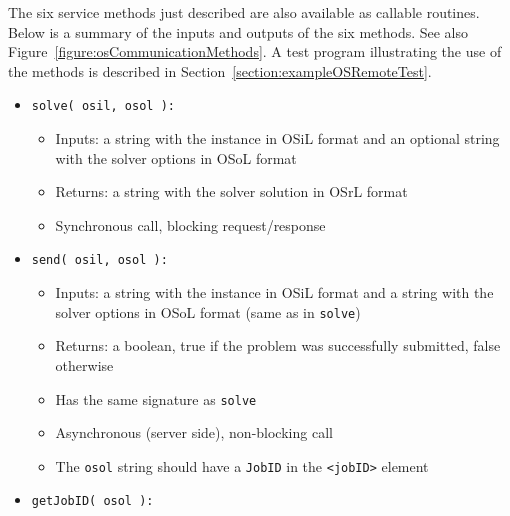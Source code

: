 \documentclass[11pt]{article}
\newcounter{Fig}
\renewcommand{\_}{{\char"5F}}
\renewcommand{\{}{{\char"7B}}
\renewcommand{\}}{{\char"7D}}
\renewcommand{\^}{{\char"0D}}
\renewcommand{\'}{{\char"0D}}
\begin{document}
\begin{enumerate}[Step 1:]
The six service methods just described are also available as callable routines.
Below is a summary of the inputs and outputs of the six methods. See also Figure~\ref{figure:osCommunicationMethods}.
A test program illustrating the use of the methods is described in Section~\ref{section:exampleOSRemoteTest}.

\begin{itemize}

\item {\tt solve( osil, osol ):}

\begin{itemize}

\item Inputs: a string with the instance in OSiL format and an optional string with the solver options
in OSoL format

\item Returns: a string with the solver solution in OSrL format

\item Synchronous call, blocking request/response

\end{itemize}



\item {\tt send( osil, osol ):}

\begin{itemize}

\item Inputs: a string with the instance in OSiL format and a string with the solver options
in OSoL format (same as in {\tt solve})

\item Returns:  a boolean, true if the problem was successfully submitted, false otherwise

\item Has the same signature as {\tt solve}

\item Asynchronous (server side), non-blocking call

\item The {\tt osol} string should have a {\tt JobID} in the {\tt <jobID>} element
\end{itemize}


\item {\tt getJobID( osol ):}


\end{itemize}
\end{enumerate}
\end{document}
